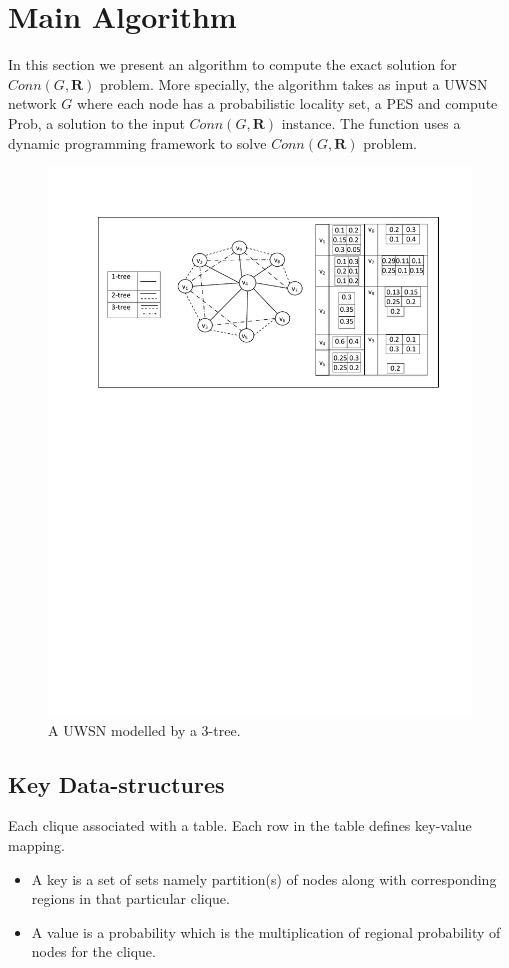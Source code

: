 \documentclass[11pt]{article}
\begin{document}
\section{Main Algorithm}
\label{subsec:mainAlg}
In this section we present an algorithm to compute the exact solution for $Conn(G,\textbf{R})$ problem. More specially, the algorithm  takes as input a UWSN network $G$ where each node has a probabilistic locality set, a PES and compute Prob, a solution to the input $Conn(G,\textbf{R})$ instance. The function uses a dynamic programming framework to solve $Conn(G,\textbf{R})$ problem.\\
\begin{figure}[h]
\centering
\includegraphics[width=5 in, height=2.5 in]{Example1.pdf}
 \caption{ A UWSN modelled by a $3$-tree.
 \label{fig:3t}
}
\end{figure}
\subsection{Key Data-structures}
\label{subsec:kds}
Each clique associated with a table. Each row in the table defines key-value mapping.
\begin{itemize}[noitemsep,nolistsep]
\item A key is a set of sets namely partition(s) of nodes along with corresponding regions in that particular clique. 
\item A value is a probability which is the multiplication of regional probability of nodes for the clique.
\end{itemize}
\end{document}
